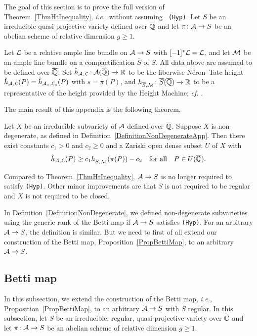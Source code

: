 
The goal of this section is to prove the full version of
Theorem~\ref{ThmHtInequality}, \textit{i.e.}, without assuming {\tt
(Hyp)}. Let $S$ be an irreducible quasi-projective variety defined over ${\overline{\mathbb{Q}}}$ and let $\pi\colon\mathcal{A}\rightarrow S$ be an abelian scheme of relative dimension $g \ge 1$. 


Let ${\mathcal L}$ be a relative ample line bundle on $\mathcal{A} \rightarrow S$ with $[-1]^*{\mathcal L}={\mathcal L}$, and
let ${\mathcal M}$ be an ample line bundle on a compactification $\overline{S}$
of $S$. All data above are assumed to be defined over ${\overline{\mathbb{Q}}}$. Set
$\hat{h}_{\mathcal{A},{\mathcal L}} \colon \mathcal{A}({\overline{\mathbb{Q}}}) \rightarrow {\mathbb{R}}$ to be the
fiberwise N\'{e}ron--Tate height $\hat{h}_{\mathcal{A},{\mathcal L}}(P) =
\hat{h}_{\mathcal{A}_s,{\mathcal L}_s}(P)$ with $s = \pi(P)$, and $h_{\overline{S},{\mathcal M}}
\colon \overline{S}({\overline{\mathbb{Q}}}) \rightarrow {\mathbb{R}}$ to be a representative of
 the height provided by the Height Machine; \textit{cf.} \cite[Chapter~2 and 9]{BG}.

The main result of this appendix is the following theorem.

\begin{theorem}\label{ThmHtInequalityFull}
Let $X$ be an irreducible subvariety of $\mathcal{A}$
defined over ${\overline{\mathbb{Q}}}$.   Suppose $X$ is non-degenerate,
as defined in Definition~\ref{DefinitionNonDegenerateApp}. Then there
exist constants $c_1>0$ and $c_2\ge 0$ and a Zariski open dense subset
$U$ of $X$ with %
\begin{equation}\label{EqHtInequalityFull}
\hat{h}_{\mathcal{A},{\mathcal L}}(P) \ge c_1 h_{\overline{S},{\mathcal M}}( \pi(P) ) - c_2 \quad \text{for all}\quad P \in U({\overline{\mathbb{Q}}}).
\end{equation}
\end{theorem}

Compared to Theorem~\ref{ThmHtInequality}, $\mathcal{A} \rightarrow S$ is no longer required to satisfy {\tt (Hyp)}. Other minor improvements are that $S$ is not required to be regular and $X$ is not required to be closed.

In Definition~\ref{DefinitionNonDegenerate}, we defined non-degenerate subvarieties using the generic rank of the Betti map if $\mathcal{A} \rightarrow S$ satisfies {\tt (Hyp)}. For an arbitrary $\mathcal{A} \rightarrow S$, the definition is similar. But we need to first of all extend our construction of the Betti map, Proposition~\ref{PropBettiMap}, to an arbitrary $\mathcal{A} \rightarrow S$.




\subsection{Betti map}
In this subsection, we extend the construction of the Betti map, \textit{i.e.}, Proposition~\ref{PropBettiMap}, to an arbitrary $\mathcal{A} \rightarrow S$ with $S$ regular. %
In this subsection, let $S$ be an  irreducible, regular, quasi-projective variety over ${\mathbb{C}}$ and let $\pi \colon \mathcal{A} \rightarrow S$ be an abelian scheme of relative dimension $g \ge 1$.


